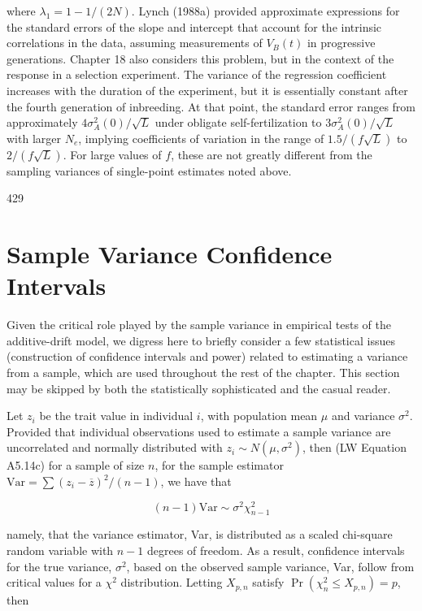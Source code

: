 \documentclass{article}
\begin{document}
where  $ \lambda_1 = 1 - 1/(2N) $. Lynch (1988a) provided approximate expressions for the standard errors of the slope and intercept that account for the intrinsic correlations in the data, assuming measurements of  $ V_B(t) $ in progressive generations. Chapter 18 also considers this problem, but in the context of the response in a selection experiment. The variance of the regression coefficient increases with the duration of the experiment, but it is essentially constant after the fourth generation of inbreeding. At that point, the standard error ranges from approximately  $ 4\sigma_A^2(0)/\sqrt{L} $ under obligate self-fertilization to  $ 3\sigma_A^2(0)/\sqrt{L} $ with larger  $ N_e $, implying coefficients of variation in the range of  $ 1.5/(f\sqrt{L}) $ to  $ 2/(f\sqrt{L}) $. For large values of  $ f $, these are not greatly different from the sampling variances of single-point estimates noted above.

429

\section{Sample Variance Confidence Intervals}
Given the critical role played by the sample variance in empirical tests of the additive-drift model, we digress here to briefly consider a few statistical issues (construction of confidence intervals and power) related to estimating a variance from a sample, which are used throughout the rest of the chapter. This section may be skipped by both the statistically sophisticated and the casual reader.

Let  $ z_i $ be the trait value in individual  $ i $, with population mean  $ \mu $ and variance  $ \sigma^2 $. Provided that individual observations used to estimate a sample variance are uncorrelated and normally distributed with  $ z_i \sim N(\mu, \sigma^2) $, then (LW Equation A5.14c) for a sample of size  $ n $, for the sample estimator  $ \text{Var} = \sum(z_i - \overline{z})^2 / (n - 1) $, we have that

\begin{equation}
(n-1)\mathrm{Var}\sim\sigma^{2}\chi^{2}_{n-1}
\tag{12.5a}
\label{eq:12_5a}
\end{equation}

namely, that the variance estimator, Var, is distributed as a scaled chi-square random variable with $n-1$ degrees of freedom. As a result, confidence intervals for the true variance, $\sigma^2$, based on the observed sample variance, Var, follow from critical values for a $\chi^2$ distribution. Letting $X_{p,n}$ satisfy $\Pr(\chi_n^2 \leq X_{p,n}) = p$, then
\end{document}
